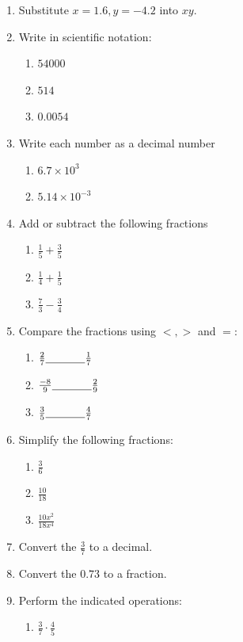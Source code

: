 \documentclass[12pt]{article}
\newcommand{\blk}{\underline{\hspace{0.5in}}}
\begin{document}
\begin{enumerate}
	\item Substitute $x=1.6, y=-4.2$ into $xy$.
	\item Write in scientific notation:
	\begin{enumerate}
		\item $54000$
		\item $514$
		\item $0.0054$
	\end{enumerate}
	\item Write each number as a decimal number
	\begin{enumerate}
		\item $6.7 \times 10^3$
		\item $5.14 \times 10^{-3}$
	\end{enumerate}
	\item Add or subtract the following fractions
	\begin{enumerate}
		\item $\frac{1}{5} + \frac{3}{5}$
		\item $\frac{1}{4} + \frac{1}{5}$
		\item $\frac{7}{3} - \frac{3}{4}$
	\end{enumerate}
	\item Compare the fractions using $<, >$ and $=$:
	\begin{enumerate}
		\item $\frac{2}{7} \blk \frac{1}{7}$
		\item $\frac{-8}{9} \blk \frac{2}{9}$ 
		\item $\frac{3}{5} \blk \frac{4}{7}$
	\end{enumerate}
	\item Simplify the following fractions:
	\begin{enumerate}
		\item $\frac{3}{6}$
		\item $\frac{10}{18}$
		\item $\frac{10x^2}{18x^4}$
	\end{enumerate}
	\item Convert the $\frac{3}{7}$ to a decimal.
	\item Convert the $0.73$ to a fraction.
	\item Perform the indicated operations:
	\begin{enumerate}
		\item $\frac{3}{7} \cdot \frac{4}{5}$

\end{enumerate}
\end{enumerate}
\end{document}
